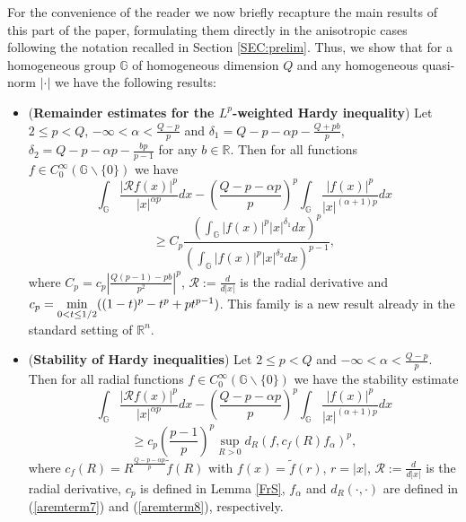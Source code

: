\documentclass[a4paper,12pt,reqno]{amsart}
\renewcommand\eqref[1]{(\ref{#1})} %
\numberwithin{equation}{section}
\theoremstyle{plain}
\theoremstyle{definition}
\newcommand{\Rn}{\mathbb R^{n}}
\begin{document}
For the convenience of the reader we now briefly recapture the main results of this part of the  paper, formulating them directly in the anisotropic cases following the notation recalled in Section \ref{SEC:prelim}.
Thus, we show that for a homogeneous group $\mathbb{G}$ of homogeneous dimension $Q$ and any homogeneous quasi-norm $|\cdot|$ we have the following results:
\begin{itemize}
\item ({\bf Remainder estimates for the $L^{p}$-weighted Hardy inequality})
Let $2\leq p<Q$, $-\infty<\alpha<\frac{Q-p}{p}$ and $\delta_{1}=Q-p-\alpha p-\frac{Q+pb}{p}$, $\delta_{2}=Q-p-\alpha p-\frac{bp}{p-1}$ for any $b\in\mathbb{R}$. Then
for all functions $f\in C_{0}^{\infty}(\mathbb{G}\backslash\{0\})$ we have
$$\int_{\mathbb{G}}\frac{|\mathcal{R}f(x)|^{p}}{|x|^{\alpha p}}dx-\left(\frac{Q-p-\alpha p}{p}\right)^{p}\int_{\mathbb{G}}\frac{|f(x)|^{p}}{|x|^{(\alpha+1)p}}dx$$
$$
\geq C_{p} \frac{\left(\int_{\mathbb{G}}|f(x)|^{p}|x|^{\delta_{1}}dx\right)^{p}}
{\left(\int_{\mathbb{G}}|f(x)|^{p}|x|^{\delta_{2}}dx\right)^{p-1}},
$$
where $C_{p}=c_{p}
\left|\frac{Q(p-1)-pb}{p^{2}}\right|^{p}$, $\mathcal{R}:=\frac{d}{d|x|}$ is the radial derivative and $c_{p}=\underset{0<t\leq1/2}{\rm min}((1-t)^{p}-t^{p}+pt^{p-1})$. This family is a new result already in the standard setting of $\Rn$.
\item ({\bf Stability of Hardy inequalities})
Let $2\leq p<Q$ and $-\infty<\alpha<\frac{Q-p}{p}$. Then for all radial functions $f\in C_{0}^{\infty}(\mathbb{G}\backslash\{0\})$ we have the stability estimate
$$\int_{\mathbb{G}}\frac{|\mathcal{R}f(x)|^{p}}{|x|^{\alpha p}}dx-\left(\frac{Q-p-\alpha p}{p}\right)^{p}\int_{\mathbb{G}}\frac{|f(x)|^{p}}{|x|^{(\alpha+1)p}}dx$$
$$
\geq c_{p}\left(\frac{p-1}{p}\right)^{p}\sup_{R>0}d_{R}(f,c_{f}(R)f_{\alpha})^{p},
$$
where $c_{f}(R)=R^{\frac{Q-p-\alpha p}{p}}\widetilde{f}(R)$ with $f(x)=\widetilde{f}(r)$, $r=|x|$,
$\mathcal{R}:=\frac{d}{d|x|}$ is the radial derivative, $c_{p}$ is defined in Lemma \ref{FrS}, $f_{\alpha}$ and $d_{R}(\cdot,\cdot)$ are defined in \eqref{aremterm7} and \eqref{aremterm8}, respectively.


\end{itemize}
\end{document}
